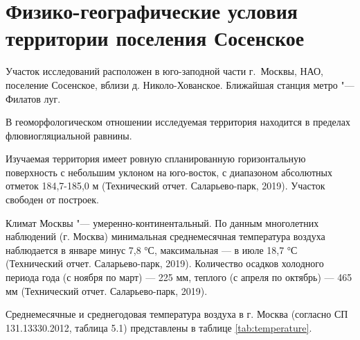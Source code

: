 \chapter{Физико-географические условия территории поселения Сосенское}\label{ch:ch1}
 
Участок исследований расположен в юго-заподной части г.~Москвы, НАО,
 поселение Сосенское, 
вблизи д. Николо-Хованское. Ближайшая станция метро "--- Филатов луг.

В геоморфологическом отношении исследуемая территория находится в пределах 
флювиогляциальной равнины. 

Изучаемая территория имеет ровную спланированную горизонтальную 
поверхность с небольшим уклоном на юго-восток, 
с диапазоном абсолютных отметок 184,7-185,0 м 
(Технический отчет. Саларьево-парк, 2019). Участок свободен от построек.

Климат Москвы "--- умеренно-континентальный. 
По данным многолетних наблюдений (г. Москва) минимальная 
среднемесячная температура воздуха 
наблюдается в январе минус 7,8 °С, максимальная — в июле 18,7 °С 
(Технический отчет. Саларьево-парк, 2019). 
Количество осадков холодного периода года (с ноября по март) — 225 мм, теплого 
(с апреля по октябрь) — 465 мм (Технический отчет. Саларьево-парк, 2019). 

Среднемесячные и среднегодовая температура воздуха в г. Москва 
(согласно СП 131.13330.2012, таблица 5.1) 
представлены в таблице \ref{tab:temperature}.


